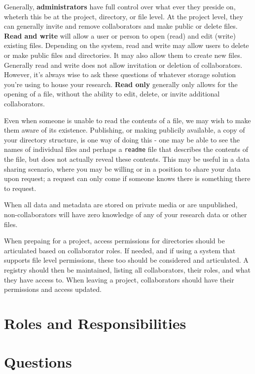 \documentclass[
]{book}
\begin{document}
Generally, \textbf{administrators} have full control over what ever they preside on, wheterh this be at the project, directory, or file level. At the project level, they can generally invite and remove collaborators and make public or delete files. \textbf{Read and write} will allow a user or person to open (read) and edit (write) existing files. Depending on the system, read and write may allow users to delete or make public files and directories. It may also allow them to create new files. Generally read and write does not allow invitation or deletion of collaborators. However, it's always wise to ask these questions of whatever storage solution you're using to house your research. \textbf{Read only} generally only allows for the opening of a file, without the ability to edit, delete, or invite additional collaborators.

Even when someone is unable to read the contents of a file, we may wish to make them aware of its existence. Publishing, or making publicily available, a copy of your directory structure, is one way of doing this - one may be able to see the names of individual files and perhaps a \texttt{readme} file that describes the contents of the file, but does not actually reveal these contents. This may be useful in a data sharing scenario, where you may be willing or in a position to share your data upon request; a request can only come if someone knows there is something there to request.

When all data and metadata are stored on private media or are unpublished, non-collaborators will have zero knowledge of any of your research data or other files.

When prepaing for a project, access permissions for directories should be articulated based on collaborator roles. If needed, and if using a system that supports file level permissions, these too should be considered and articulated. A registry should then be maintained, listing all collaborators, their roles, and what they have access to. When leaving a project, collaborators should have their permissions and access updated.

\hypertarget{roles-and-responsibilities-4}{%
\section*{Roles and Responsibilities}\label{roles-and-responsibilities-4}}

\hypertarget{questions-6}{%
\section*{Questions}\label{questions-6}}
\end{document}
